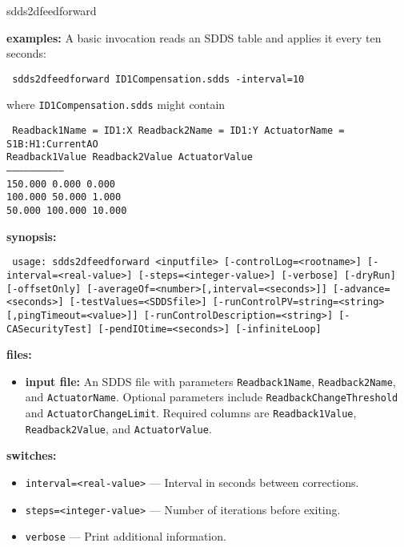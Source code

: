 \begin{sddsprog}{sdds2dfeedforward}
\item \textbf{examples:}
A basic invocation reads an SDDS table and applies it every ten seconds:
\begin{flushleft}{\tt
sdds2dfeedforward ID1Compensation.sdds -interval=10
}\end{flushleft}
where \verb+ID1Compensation.sdds+ might contain
\begin{flushleft}{\tt
Readback1Name = ID1:X \quad Readback2Name = ID1:Y \quad ActuatorName = S1B:H1:CurrentAO\\
 Readback1Value  Readback2Value  ActuatorValue\\
------------------------------\\
       150.000       0.000          0.000\\
       100.000      50.000          1.000\\
        50.000     100.000         10.000\\
}\end{flushleft}
\item \textbf{synopsis:}
\begin{flushleft}{\tt
usage: sdds2dfeedforward <inputfile>\
       [-controlLog=<rootname>]\
       [-interval=<real-value>] [-steps=<integer-value>]\
       [-verbose] [-dryRun] [-offsetOnly]\
       [-averageOf=<number>[,interval=<seconds>]]\
       [-advance=<seconds>]\
       [-testValues=<SDDSfile>]\
       [-runControlPV=string=<string>[,pingTimeout=<value>]]\
       [-runControlDescription=<string>]\
       [-CASecurityTest]\
       [-pendIOtime=<seconds>] [-infiniteLoop]
}\end{flushleft}
\item \textbf{files:}
\begin{itemize}
  \item \textbf{input file:} An SDDS file with parameters \verb+Readback1Name+,
  \verb+Readback2Name+, and \verb+ActuatorName+.  Optional parameters include
  \verb+ReadbackChangeThreshold+ and \verb+ActuatorChangeLimit+.  Required
  columns are \verb+Readback1Value+, \verb+Readback2Value+, and
  \verb+ActuatorValue+.
\end{itemize}
\item \textbf{switches:}
\begin{itemize}
  \item {\tt interval=<real-value>} --- Interval in seconds between corrections.
  \item {\tt steps=<integer-value>} --- Number of iterations before exiting.
  \item {\tt verbose} --- Print additional information.

\end{itemize}
\end{sddsprog}
